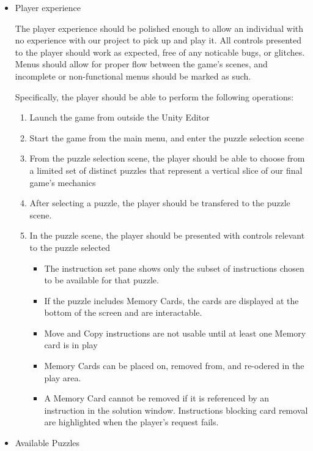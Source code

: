 \begin{itemize}
  \item Player experience
  
  The player experience should be polished enough to allow an individual with no experience with our project to pick up and play it. All controls presented to the player should work as expected, free of any noticable bugs, or glitches. Menus should allow for proper flow between the game's scenes, and incomplete or non-functional menus should be marked as such.

  Specifically, the player should be able to perform the following operations:

  \begin{enumerate}
    \item Launch the game from outside the Unity Editor
    \item Start the game from the main menu, and enter the puzzle selection scene
    \item From the puzzle selection scene, the player should be able to choose from a limited set of distinct puzzles that represent a vertical slice of our final game's mechanics
    \item After selecting a puzzle, the player should be transfered to the puzzle scene.
    \item In the puzzle scene, the player should be presented with controls relevant to the puzzle selected
    \begin{itemize}
      \item The instruction set pane shows only the subset of instructions chosen to be available for that puzzle.
      \item If the puzzle includes Memory Cards, the cards are displayed at the bottom of the screen and are interactable.
      \item Move and Copy instructions are not usable until at least one Memory card is in play
      \item Memory Cards can be placed on, removed from, and re-odered in the play area.
      \item A Memory Card cannot be removed if it is referenced by an instruction in the solution window. Instructions blocking card removal are highlighted when the player's request fails.
    \end{itemize}
  \end{enumerate}


  \item Available Puzzles
  

\end{itemize}
